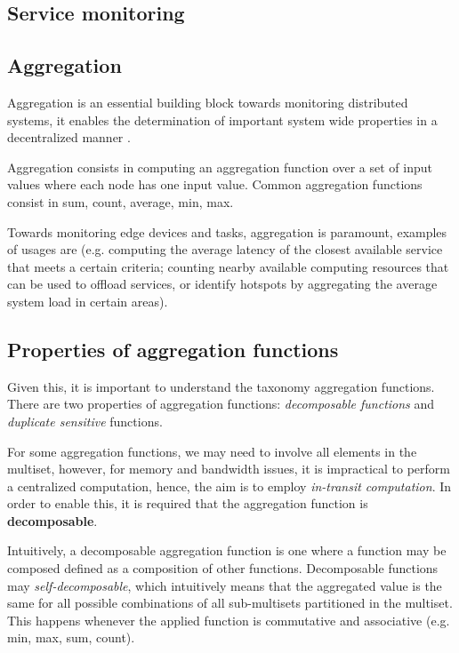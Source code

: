 \subsection{Service monitoring}




\subsection{Aggregation} 

Aggregation is an essential building block towards monitoring distributed systems, it  enables the determination of important system wide properties in a decentralized manner \cite{DBLP:journals/corr/abs-1110-0725}.

Aggregation consists in computing an aggregation function over a set of input values where each node has one input value. Common aggregation functions consist in sum, count, average, min, max.

Towards monitoring edge devices and tasks, aggregation is paramount, examples of usages are (e.g. computing the average latency of the closest available service that meets a certain criteria; counting nearby available computing resources that can be used to offload services, or identify hotspots by aggregating the average system load in certain areas).

\subsection{Properties of aggregation functions}

Given this, it is important to understand the taxonomy aggregation functions. There are two properties of aggregation functions: \textit{decomposable functions} and \textit{duplicate sensitive} functions.

For some aggregation functions, we may need to involve all elements in the multiset, however, for memory and bandwidth issues, it is impractical to perform a centralized computation, hence, the aim is to employ \textit{in-transit computation}. In order to enable this, it is required that the aggregation function is \textbf{decomposable}. 

Intuitively, a decomposable aggregation function is one where a function may be composed defined as a composition of other functions. Decomposable functions may \textit{self-decomposable}, which intuitively means that the aggregated value is the same for all possible combinations of all sub-multisets partitioned in the multiset. This happens whenever the applied function is commutative and associative (e.g. min, max, sum, count).

